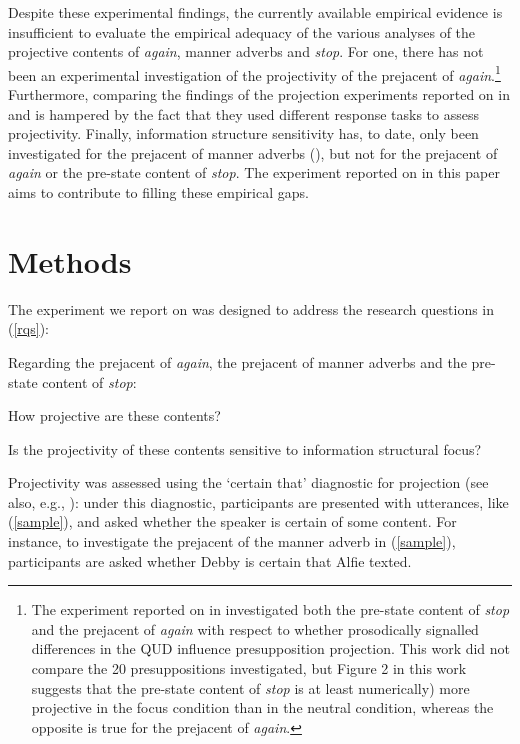 \documentclass[a4paper,12pt]{article}
\newcommand{\6}{\mbox{$[\hspace*{-.6mm}[$}}
\newcommand{\9}{\mbox{$]\hspace*{-.6mm}]$}}
\begin{document}
Despite these experimental findings, the currently available empirical evidence is insufficient to evaluate the empirical adequacy of the various analyses of the projective contents of {\em again}, manner adverbs and {\em stop}. For one, there has not been an experimental investigation of the projectivity of the prejacent of {\em again}.\footnote{The experiment reported on in \citealt{cummins-rohde2015} investigated both the pre-state content of {\em stop} and the prejacent of {\em again} with respect to whether prosodically signalled differences in the QUD influence presupposition projection. This work did not compare the 20 presuppositions investigated, but Figure 2 in this work suggests that the pre-state content of {\em stop} is at least numerically) more projective in the focus condition than in the neutral condition, whereas the opposite is true for the prejacent of {\em again}.} Furthermore, comparing the findings of the projection experiments reported on in \citealt{xue-onea11,stevens-etal2017} and \citealt{tbd-variability} is hampered by the fact that they used different response tasks to assess projectivity. Finally, information structure sensitivity has, to date, only been investigated for the prejacent of manner adverbs (\citealt{stevens-etal2017}), but not for the prejacent of {\em again} or the pre-state content of {\em stop}. The experiment reported on in this paper aims to contribute to filling these empirical gaps.

\section{Methods}\label{s2}

The experiment we report on was designed to address the research questions in (\ref{rqs}):

\begin{exe}
\ex\label{rqs} Regarding the prejacent of {\em again}, the prejacent of manner adverbs and the pre-state content of {\em stop}:
\begin{xlist}

\ex How projective are these contents?

\ex Is the projectivity of these contents sensitive to information structural focus?

\end{xlist}

\end{exe}

Projectivity was assessed using the `certain that' diagnostic for projection (see also, e.g., \citealt{tonhauser-salt26,djaerv-bacovcin-salt27,tbd-variability,mahler-nels}): under this diagnostic, participants are presented with utterances, like (\ref{sample}), and asked whether the speaker is certain of some content. For instance, to investigate the prejacent of the manner adverb in (\ref{sample}), participants are asked whether Debby is certain that Alfie texted. 
\end{document}
